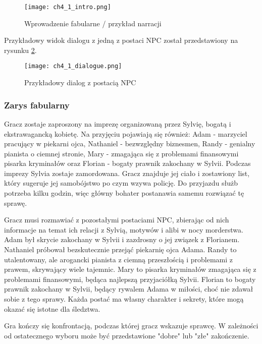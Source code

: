 \begin{figure}[h!]
    \centering
    \texttt{[image: ch4\_1\_intro.png]}
    \caption{Wprowadzenie fabularne / przykład narracji}
    \label{fig:ch4_1_intro}
\end{figure}

Przykładowy widok dialogu z jedną z postaci NPC został przedstawiony na rysunku \ref{fig:ch4_1_dialogue}.

\begin{figure}[h!]
    \centering
    \texttt{[image: ch4\_1\_dialogue.png]}
    \caption{Przykładowy dialog z postacią NPC}
    \label{fig:ch4_1_dialogue}
\end{figure}

\subsubsection*{Zarys fabularny}

Gracz zostaje zaproszony na imprezę organizowaną przez Sylvię, bogatą i ekstrawagancką kobietę. Na
przyjęciu pojawiają się również: Adam - marzyciel pracujący w piekarni ojca, Nathaniel -
bezwzględny biznesmen, Randy - genialny pianista o ciemnej stronie, Mary - zmagająca się z
problemami finansowymi pisarka kryminałów oraz Florian - bogaty prawnik zakochany w Sylvii.
Podczas imprezy Sylvia zostaje zamordowana. Gracz znajduje jej ciało i zostawiony list, który
sugeruje jej samobójstwo po czym wzywa policję. Do przyjazdu służb potrzeba kilku godzin, więc
główny bohater postanawia samemu rozwiązać tę sprawę.

Gracz musi rozmawiać z pozostałymi postaciami NPC, zbierając od nich informacje na temat ich
relacji z Sylvią, motywów i alibi w nocy morderstwa. Adam był skrycie zakochany w Sylvii i
zazdrosny o jej związek z Florianem. Nathaniel próbował bezskutecznie przejąć piekarnię ojca Adama.
Randy to utalentowany, ale arogancki pianista z ciemną przeszłością i problemami z prawem,
skrywający wiele tajemnic. Mary to pisarka kryminałów zmagająca się z problemami finansowymi,
będąca najlepszą przyjaciółką Sylvii. Florian to bogaty prawnik zakochany w Sylvii, będący rywalem
Adama w miłości, choć nie zdawał sobie z tego sprawy. Każda postać ma własny charakter i sekrety,
które mogą okazać się istotne dla śledztwa.

Gra kończy się konfrontacją, podczas której gracz wskazuje sprawcę.
W zależności od ostatecznego wyboru może być przedstawione "dobre" lub "złe" zakończenie.

